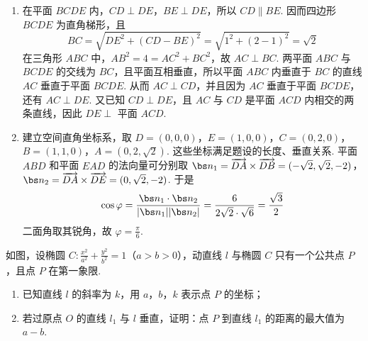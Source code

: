 \begin{solution}
\begin{enumerate}
\item
在平面 \(BCDE\) 内，\(CD\perp DE\)，\(BE\perp DE\)，所以 \(CD\parallel BE\). 因而四边形 \(BCDE\) 为直角梯形，且
\[
BC=\sqrt{DE^2+(CD-BE)^2}=\sqrt{1^2+(2-1)^2}=\sqrt2
\]
在三角形 \(ABC\) 中，\(AB^2=4=AC^2+BC^2\)，故 \(AC\perp BC\). 两平面 \(ABC\) 与 \(BCDE\) 的交线为 \(BC\)，且平面互相垂直，所以平面 \(ABC\) 内垂直于 \(BC\) 的直线 \(AC\) 垂直于平面 \(BCDE\). 从而 \(AC\perp CD\)，并且因为 \(AC\) 垂直于平面 \(BCDE\)，还有 \(AC\perp DE\). 又已知 \(CD\perp DE\)，且 \(AC\) 与 \(CD\) 是平面 \(ACD\) 内相交的两条直线，因此 \(DE\perp\) 平面 \(ACD\).

\item
建立空间直角坐标系，取
\(D=(0,0,0)\)，\(E=(1,0,0)\)，\(C=(0,2,0)\)，\(B=(1,1,0)\)，\(A=(0,2,\sqrt2)\).
这些坐标满足题设的长度、垂直关系. 平面 \(ABD\) 和平面 \(EAD\) 的法向量可分别取
\(\bs n_1=\overrightarrow{DA}\times\overrightarrow{DB}=(-\sqrt2,\sqrt2,-2)\)，\(\bs n_2=\overrightarrow{DA}\times\overrightarrow{DE}=(0,\sqrt2,-2)\).
于是
\[
\cos\varphi
=\frac{\bs n_1\cdot\bs n_2}{|\bs n_1||\bs n_2|}
=\frac{6}{2\sqrt2\cdot\sqrt6}
=\frac{\sqrt3}{2}
\]
二面角取其锐角，故 \(\varphi=\frac\pi6\).
\end{enumerate}
\end{solution}

\begin{problem}
如图，设椭圆 \(C: \frac{x^2}{a^2} + \frac{y^2}{b^2} = 1\)（\(a > b > 0\)），动直线 \(l\) 与椭圆 \(C\) 只有一个公共点 \(P\)，且点 \(P\) 在第一象限.

\begin{enumerate}
\item 已知直线 \(l\) 的斜率为 \(k\)，用 \(a\)，\(b\)，\(k\) 表示点 \(P\) 的坐标；
\item 若过原点 \(O\) 的直线 \(l_{1}\) 与 \(l\) 垂直，证明：点 \(P\) 到直线 \(l_{1}\) 的距离的最大值为 \(a - b\).
\end{enumerate}

\end{problem}

